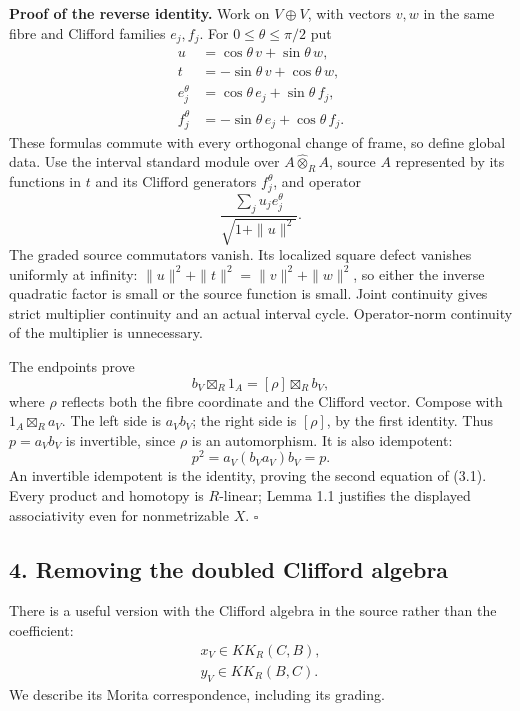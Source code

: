 \documentclass[
  11pt,
]{article}
\begin{document}
\textbf{Proof of the reverse identity.} Work on \(V\oplus V\), with
vectors \(v,w\) in the same fibre and Clifford families \(e_j,f_j\). For
\(0\leq\theta\leq\pi/2\) put \[
\begin{aligned}
u&=\cos\theta\,v+\sin\theta\,w,\\
t&=-\sin\theta\,v+\cos\theta\,w,\\
e_j^\theta&=\cos\theta\,e_j+\sin\theta\,f_j,\\
f_j^\theta&=-\sin\theta\,e_j+\cos\theta\,f_j .
\end{aligned}
\tag{3.7}
\] These formulas commute with every orthogonal change of frame, so
define global data. Use the interval standard module over
\(A\widehat\otimes_R A\), source \(A\) represented by its functions in
\(t\) and its Clifford generators \(f_j^\theta\), and operator \[
\frac{\sum_ju_je_j^\theta}{\sqrt{1+\|u\|^2}}.
\tag{3.8}
\] The graded source commutators vanish. Its localized square defect
vanishes uniformly at infinity: \(\|u\|^2+\|t\|^2=\|v\|^2+\|w\|^2\), so
either the inverse quadratic factor is small or the source function is
small. Joint continuity gives strict multiplier continuity and an actual
interval cycle. Operator-norm continuity of the multiplier is
unnecessary.

The endpoints prove \[
b_V\boxtimes_R1_A=[\rho]\boxtimes_R b_V,
\tag{3.9}
\] where \(\rho\) reflects both the fibre coordinate and the Clifford
vector. Compose with \(1_A\boxtimes_R a_V\). The left side is
\(a_Vb_V\); the right side is \([\rho]\), by the first identity. Thus
\(p=a_Vb_V\) is invertible, since \(\rho\) is an automorphism. It is
also idempotent: \[
p^2=a_V(b_Va_V)b_V=p.
\tag{3.10}
\] An invertible idempotent is the identity, proving the second equation
of (3.1). Every product and homotopy is \(R\)-linear; Lemma 1.1
justifies the displayed associativity even for nonmetrizable \(X\).
\(\square\)

\subsection{4. Removing the doubled Clifford
algebra}\label{removing-the-doubled-clifford-algebra}

There is a useful version with the Clifford algebra in the source rather
than the coefficient: \[
\begin{gathered}
x_V\in KK_R(C,B),\\
y_V\in KK_R(B,C).
\end{gathered}
\tag{4.1}
\] We describe its Morita correspondence, including its grading.
\end{document}
